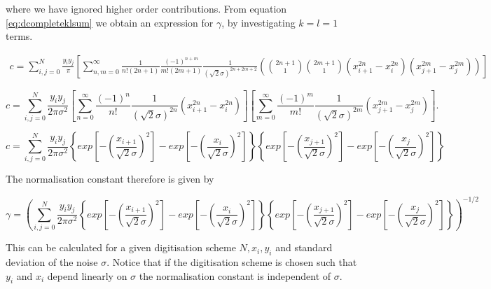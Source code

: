 \documentclass[apj]{emulateapj}
\begin{document}
where we have ignored higher order contributions. From equation \ref{eq:dcompleteklsum} we obtain an expression for $\gamma$, by investigating $k=l=1$ terms.

\begin{equation}
\begin{aligned}
c = \sum_{i,j=0}^N  \frac{y_i y_j}{\pi} \left[ \sum_{n,m = 0}^\infty \frac{1}{n! (2n+1)} \frac{(-1)^{n+m}}{m! (2m+1)} \frac{1}{(\sqrt{2}\sigma)^{2n+2m+2}} \left( {2n+1 \choose 1} {2m+1 \choose 1} ( x_{i+1}^{2n} - x_{i}^{2n} ) ( x_{j+1}^{2m} - x_{j}^{2m} ) \right) \right]
\end{aligned}
\end{equation}

\begin{equation}
c = \sum_{i,j=0}^N \frac{y_i y_j}{2\pi\sigma^2} \left[ \sum_{n = 0}^\infty \frac{(-1)^n}{n!} \frac{1}{(\sqrt{2}\sigma)^{2n}}  ( x_{i+1}^{2n} - x_{i}^{2n} ) \right] \left[ \sum_{m = 0}^\infty \frac{(-1)^m}{m!} \frac{1}{(\sqrt{2}\sigma)^{2m}} ( x_{j+1}^{2m} - x_{j}^{2m} ) \right].
\end{equation}

\begin{equation}
c = \sum_{i,j=0}^N \frac{y_i y_j}{2\pi\sigma^2} \left\{ exp \left[ - \left(\frac{x_{i+1}}{\sqrt{2}\sigma} \right)^2 \right] - exp \left[ - \left(\frac{x_{i}}{\sqrt{2}\sigma} \right)^2 \right] \right\} \left\{ exp \left[ - \left(\frac{x_{j+1}}{\sqrt{2}\sigma} \right)^2 \right] - exp \left[ - \left(\frac{x_{j}}{\sqrt{2}\sigma} \right)^2 \right] \right\}
\end{equation}

The normalisation constant therefore is given by

\begin{equation}
\gamma = \left( \sum_{i,j=0}^N \frac{y_i y_j}{2\pi\sigma^2} \left\{ exp \left[ - \left(\frac{x_{i+1}}{\sqrt{2}\sigma} \right)^2 \right] - exp \left[ - \left(\frac{x_{i}}{\sqrt{2}\sigma} \right)^2 \right] \right\} \left\{ exp \left[ - \left(\frac{x_{j+1}}{\sqrt{2}\sigma} \right)^2 \right] - exp \left[ - \left(\frac{x_{j}}{\sqrt{2}\sigma} \right)^2 \right] \right\} \right)^{-1/2}
\end{equation}

This can be calculated for a given digitisation scheme $N, x_i, y_i$ and standard deviation of the noise $\sigma$. Notice that if the digitisation scheme is chosen such that $y_i$ and $x_i$ depend linearly on $\sigma$ the normalisation constant is independent of $\sigma$.




\end{document}
